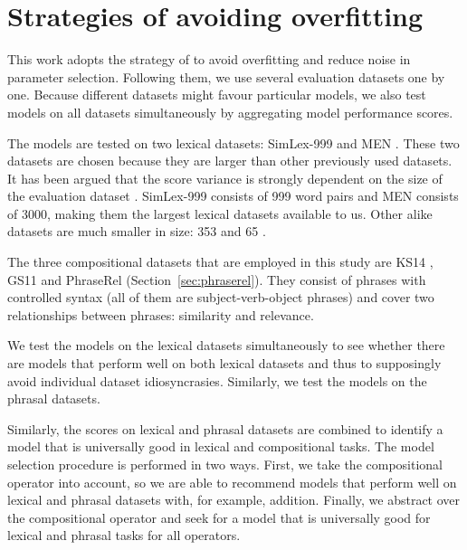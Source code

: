 
\section{Strategies of avoiding overfitting}
\label{sec:avoiding-overfitting}

This work adopts the strategy of  to avoid overfitting and reduce noise in parameter selection. Following them, we use several evaluation datasets one by one. Because different datasets might favour particular models, we also test models on all datasets simultaneously by aggregating model performance scores.

The models are tested on two lexical datasets: SimLex-999 \cite{hill2014simlex} and MEN \cite{Bruni:2014:MDS:2655713.2655714}. These two datasets are chosen because they are larger than other previously used datasets. It has been argued that the score variance is strongly dependent on the size of the evaluation dataset \cite{W16-2502}. SimLex-999 consists of 999 word pairs and MEN consists of 3000, making them the largest lexical datasets available to us. Other alike datasets are much smaller in size: 353 \cite{2002:PSC:503104.503110} and 65 \cite{Rubenstein:1965:CCS:365628.365657}.

The three compositional datasets that are employed in this study are KS14 \cite{kartsadrqpl2014}, GS11 \cite{Grefenstette:2011:ESC:2145432.2145580} and PhraseRel (Section~\ref{sec:phraserel}). They consist of phrases with controlled syntax (all of them are subject-verb-object phrases) and cover two relationships between phrases: similarity and relevance.

We test the models on the lexical datasets simultaneously to see whether there are models that perform well on both lexical datasets and thus to supposingly avoid individual dataset idiosyncrasies. Similarly, we test the models on the phrasal datasets.

Similarly, the scores on lexical and phrasal datasets are combined
to identify a model that is universally good in lexical and compositional tasks. The model selection procedure is performed in two ways. First, we take the compositional operator into account, so we are able to recommend models that perform well on lexical and phrasal datasets with, for example, addition. Finally, we abstract over the compositional operator and seek for a model that is universally good for lexical and phrasal tasks for all operators.

